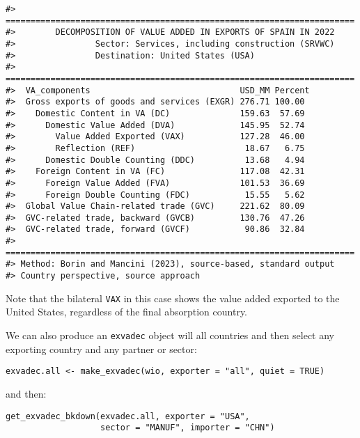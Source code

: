 \begin{verbatim}
#> ======================================================================
#>        DECOMPOSITION OF VALUE ADDED IN EXPORTS OF SPAIN IN 2022
#>                Sector: Services, including construction (SRVWC)
#>                Destination: United States (USA)
#> ======================================================================
#>  VA_components                              USD_MM Percent
#>  Gross exports of goods and services (EXGR) 276.71 100.00 
#>    Domestic Content in VA (DC)              159.63  57.69 
#>      Domestic Value Added (DVA)             145.95  52.74 
#>        Value Added Exported (VAX)           127.28  46.00 
#>        Reflection (REF)                      18.67   6.75 
#>      Domestic Double Counting (DDC)          13.68   4.94 
#>    Foreign Content in VA (FC)               117.08  42.31 
#>      Foreign Value Added (FVA)              101.53  36.69 
#>      Foreign Double Counting (FDC)           15.55   5.62 
#>  Global Value Chain-related trade (GVC)     221.62  80.09 
#>  GVC-related trade, backward (GVCB)         130.76  47.26 
#>  GVC-related trade, forward (GVCF)           90.86  32.84 
#> ======================================================================
#> Method: Borin and Mancini (2023), source-based, standard output
#> Country perspective, source approach
\end{verbatim}

Note that the bilateral \texttt{VAX} in this case shows the value added exported to
the United States, regardless of the final absorption country.

We can also produce an \texttt{exvadec} object will all countries and then select any
exporting country and any partner or sector:

\begin{verbatim}
exvadec.all <- make_exvadec(wio, exporter = "all", quiet = TRUE)
\end{verbatim}

and then:

\begin{verbatim}
get_exvadec_bkdown(exvadec.all, exporter = "USA", 
                   sector = "MANUF", importer = "CHN")
\end{verbatim}

